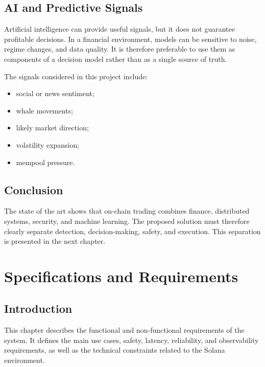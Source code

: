 \documentclass[12pt,a4paper]{report}
\begin{document}
\section{AI and Predictive Signals}

Artificial intelligence can provide useful signals, but it does not guarantee profitable decisions. In a financial environment, models can be sensitive to noise, regime changes, and data quality. It is therefore preferable to use them as components of a decision model rather than as a single source of truth.

The signals considered in this project include:
\begin{itemize}
    \item social or news sentiment;
    \item whale movements;
    \item likely market direction;
    \item volatility expansion;
    \item mempool pressure.
\end{itemize}

\section{Conclusion}

The state of the art shows that on-chain trading combines finance, distributed systems, security, and machine learning. The proposed solution must therefore clearly separate detection, decision-making, safety, and execution. This separation is presented in the next chapter.

\chapter{Specifications and Requirements}
\label{chap:requirements}

\section{Introduction}

This chapter describes the functional and non-functional requirements of the system. It defines the main use cases, safety, latency, reliability, and observability requirements, as well as the technical constraints related to the Solana environment.
\end{document}
